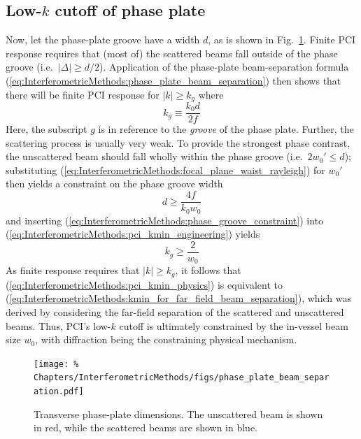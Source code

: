 \subsection{Low-$k$ cutoff of phase plate}
Now, let the phase-plate groove have a width $d$, as is shown in
Fig.~\ref{fig:InterferometricMethods:phase_plate_beam_separation}.
Finite PCI response requires that (most of) the scattered beams
fall outside of the phase groove (i.e.\ $|\Delta| \geq d / 2$).
Application of the phase-plate beam-separation formula
(\ref{eq:InterferometricMethods:phase_plate_beam_separation})
then shows that there will be finite PCI response
for $|k| \geq k_g$ where
\begin{equation}
  k_g \equiv \frac{k_0 d}{2 f}
  \label{eq:InterferometricMethods:pci_kmin_engineering}
\end{equation}
Here, the subscript $g$ is in reference
to the \emph{groove} of the phase plate.
Further, the scattering process is usually very weak.
To provide the strongest phase contrast,
the unscattered beam should fall wholly within the phase groove
(i.e.\ $2 w_0' \leq d$);
substituting (\ref{eq:InterferometricMethods:focal_plane_waist_rayleigh})
for $w_0'$ then yields a constraint on the phase groove width
\begin{equation}
  d \geq \frac{4 f}{k_0 w_0}
  \label{eq:InterferometricMethods:phase_groove_constraint}
\end{equation}
and inserting (\ref{eq:InterferometricMethods:phase_groove_constraint}) into
(\ref{eq:InterferometricMethods:pci_kmin_engineering}) yields
\begin{equation}
  k_g \geq \frac{2}{w_0}
  \label{eq:InterferometricMethods:pci_kmin_physics}
\end{equation}
As finite response requires that $|k| \geq k_g$, it follows that
(\ref{eq:InterferometricMethods:pci_kmin_physics}) is equivalent to
(\ref{eq:InterferometricMethods:kmin_for_far_field_beam_separation}),
which was derived by considering the far-field separation
of the scattered and unscattered beams.
Thus, PCI's low-$k$ cutoff
is ultimately constrained by the in-vessel beam size $w_0$,
with diffraction being the constraining physical mechanism.

\begin{figure}
  \centering
  \texttt{[image: \%
    Chapters/InterferometricMethods/figs/phase\_plate\_beam\_separation.pdf]}
  \caption[Transverse phase-plate dimensions]{%
    Transverse phase-plate dimensions.
    The unscattered beam is shown in red, while
    the scattered beams are shown in blue.}
  \label{fig:InterferometricMethods:phase_plate_beam_separation}
\end{figure}


